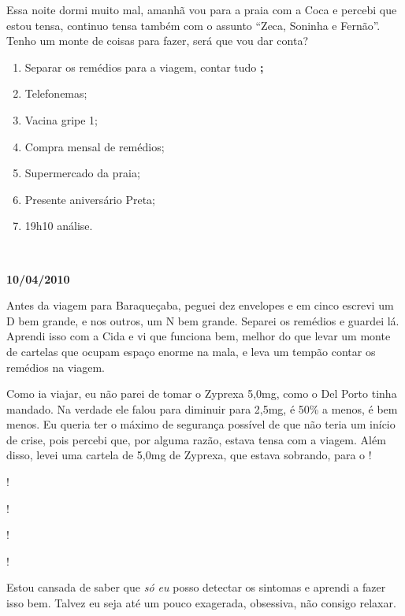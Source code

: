 Essa noite dormi muito mal, amanhã vou para a praia com a Coca e percebi
que estou tensa, continuo tensa também com o assunto ``Zeca, Soninha e
Fernão''. Tenho um monte de coisas para fazer, será que vou dar conta?

\begin{enumerate}
\item
  Separar os remédios para a viagem, contar tudo  
  \textbf{;}
\item
  Telefonemas;
\item
  Vacina gripe 1;
\item
  Compra mensal de remédios;
\item
  Supermercado da praia;
\item
  Presente aniversário Preta;
\item
  19h10 análise.
\end{enumerate}
\begin{center}​​\asterisc{}\end{center}
 \begin{flushright}\textbf{}\end{flushright}

\begin{flushright}\textbf{10/04/2010}\end{flushright}


Antes da viagem para Baraqueçaba, peguei dez envelopes e em cinco
escrevi um D bem grande, e nos outros, um N bem grande. Separei os
remédios e guardei lá. Aprendi isso com a Cida e vi que funciona bem,
melhor do que levar um monte de cartelas que ocupam espaço enorme na
mala, e leva um tempão contar os remédios na viagem.

Como ia viajar, eu não parei de tomar o Zyprexa 5,0mg, como o Del Porto
tinha mandado. Na verdade ele falou para diminuir para 2,5mg, é 50\% a
menos, é bem menos. Eu queria ter o máximo de segurança possível de que
não teria um início de crise, pois percebi que, por alguma razão, estava
tensa com a viagem. Além disso, levei uma cartela de 5,0mg de Zyprexa,
que estava sobrando, para o     !

 !

 !

     !

!

Estou cansada de saber que \emph{só eu} posso detectar os sintomas e
aprendi a fazer isso bem. Talvez eu seja até um pouco exagerada,
obsessiva, não consigo relaxar.

